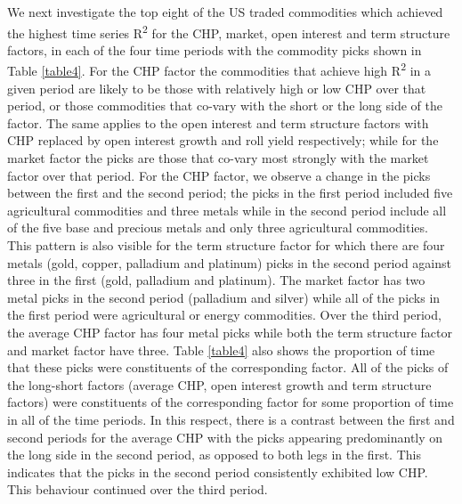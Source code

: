 \documentclass[12pt,]{article}
\begin{document}
We next investigate the top eight of the US traded commodities which
achieved the highest time series R\textsuperscript{2} for the CHP,
market, open interest and term structure factors, in each of the four
time periods with the commodity picks shown in Table \ref{table4}. For
the CHP factor the commodities that achieve high R\textsuperscript{2} in
a given period are likely to be those with relatively high or low CHP
over that period, or those commodities that co-vary with the short or
the long side of the factor. The same applies to the open interest and
term structure factors with CHP replaced by open interest growth and
roll yield respectively; while for the market factor the picks are those
that co-vary most strongly with the market factor over that period. For
the CHP factor, we observe a change in the picks between the first and
the second period; the picks in the first period included five
agricultural commodities and three metals while in the second period
include all of the five base and precious metals and only three
agricultural commodities. This pattern is also visible for the term
structure factor for which there are four metals (gold, copper,
palladium and platinum) picks in the second period against three in the
first (gold, palladium and platinum). The market factor has two metal
picks in the second period (palladium and silver) while all of the picks
in the first period were agricultural or energy commodities. Over the
third period, the average CHP factor has four metal picks while both the
term structure factor and market factor have three. Table \ref{table4}
also shows the proportion of time that these picks were constituents of
the corresponding factor. All of the picks of the long-short factors
(average CHP, open interest growth and term structure factors) were
constituents of the corresponding factor for some proportion of time in
all of the time periods. In this respect, there is a contrast between
the first and second periods for the average CHP with the picks
appearing predominantly on the long side in the second period, as
opposed to both legs in the first. This indicates that the picks in the
second period consistently exhibited low CHP. This behaviour continued
over the third period.
\end{document}
